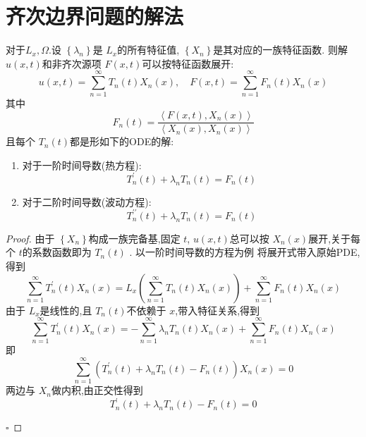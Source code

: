 \documentclass[../../main.tex]{subfiles}
\begin{document}
\section{齐次边界问题的解法}
\begin{theorem}
    对于\(  L_{x}, \Omega   \).设 \(  \left\{  \lambda _{n} \right\}  \)是 \(  L_{x}  \)的所有特征值, \(  \left\{ X_{n} \right\}  \)是其对应的一族特征函数. 则解 \(  u\left( x,t \right)   \)和非齐次源项 \(  F\left( x,t \right)   \)可以按特征函数展开: \[
    u\left( x,t \right)= \sum _{n = 1}^{\infty} T_{n}\left( t \right)X_{n}\left( x \right),\quad F\left( x,t \right)= \sum _{n = 1}^{\infty}F_{n}\left( t \right)X_{n}\left( x \right)      
    \]    其中   \[
    F_{n}\left( t \right)= \frac{\left<F\left( x,t \right),X_{n}\left( x \right)   \right> }{\left<X_{n}\left( x \right),X_{n}\left( x \right)   \right> }  
    \]且每个 \(  T_{n} \left( t \right)  \)都是形如下的ODE的解:
    \begin{enumerate}
        \item 对于一阶时间导数(热方程): \[
        T_{n}^{\prime} \left( t \right)+  \lambda _{n}T_{n}\left( t \right)= F_{n}\left( t \right)   
        \]
        \item 对于二阶时间导数(波动方程): \[
        T_{n}^{\prime \prime} \left( t \right)+  \lambda _{n}T_{n}\left( t \right)  = F_{n}\left( t \right) 
        \]
    \end{enumerate}
    
\end{theorem}
\begin{proof}
    由于 \(  \left\{ X_{n} \right\}  \)构成一族完备基,固定 \(  t  \), \(  u\left( x,t \right)   \)总可以按 \(  X_{n}\left( x \right)   \)展开,关于每个 \(  t  \)的系数函数即为 \(  T_{n}\left( t \right)   \)  .    
    以一阶时间导数的方程为例
    将展开式带入原始PDE,得到  \[
    \sum _{n = 1}^{\infty}T_{n}^{\prime} \left( t \right)X_{n}\left( x \right)= L_{x}\left( \sum _{n = 1}^{\infty}T_{n}\left( t \right)X_{n}\left( x \right)   \right)+ \sum _{n = 1}^{\infty}F_{n}\left( t \right)X_{n}\left( x \right)     
    \]由于 \(  L_{x}  \)是线性的,且 \(  T_{n}\left( t \right)   \)不依赖于 \(  x  \),带入特征关系,得到 \[
    \sum _{n = 1}^{\infty}T_{n}^{\prime} \left( t \right)X_{n}\left( x \right)  =- \sum _{n = 1}^{\infty} \lambda _{n}T_{n}\left( t \right)X_{n}\left( x \right)+ \sum _{n = 1}^{\infty}F_{n}\left( t \right)X_{n}\left( x \right)    
    \]   即 \[
    \sum _{n = 1}^{\infty}\left( T_{n}^{\prime} \left( t \right)+ \lambda _{n}T_{n}\left( t \right)-F_{n}\left( t \right)    \right)X_{n}\left( x \right)= 0  
    \]两边与 \(  X_{n}  \)做内积,由正交性得到 \[
    T_{n}^{\prime} \left( t \right)+  \lambda _{n}T_{n}\left( t \right)-F_{n}\left( t \right)= 0   
    \] 

    \hfill $\square$
\end{proof}
\end{document}

